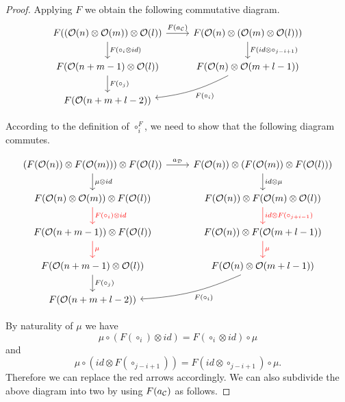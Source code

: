 \documentclass[Thesis.tex]{subfiles}
\begin{document}
\begin{proof}
 Applying $F$ we obtain the following commutative diagram.
  \begin{equation}\label{assaux}
\begin{tikzcd}
F((\OO(n)\otimes \OO(m))\otimes \OO(l)) \arrow[r, "F(a_\CC)"]\arrow[d, "F(\circ_i\otimes id)"] & F(\OO(n)\otimes (\OO(m)\otimes\OO(l)))\arrow[d, "F(id\otimes\circ_{j-i+1})"]\\
F(\OO(n+m-1)\otimes\OO(l))\arrow[d, "F(\circ_j)"] & F(\OO(n)\otimes\OO(m+l-1))\arrow[dl, bend left = 10, "F(\circ_i)"]\\
F(\OO(n+m+l-2)) & 
\end{tikzcd} 
   \end{equation}
   
   According to the definition of $\circ_i^F$, we need to show that the following diagram commutes. 
   
   \[   
\begin{tikzcd}
(F(\OO(n))\otimes F(\OO(m)))\otimes F(\OO(l)) \arrow[r, "a_\DD"] \arrow[d, "\mu\otimes id"] & F(\OO(n))\otimes (F(\OO(m))\otimes F(\OO(l)))\arrow[d, "id\otimes \mu"]\\
F(\OO(n)\otimes \OO(m))\otimes F(\OO(l))\arrow[d, red, "F(\circ_i)\otimes id"] & F(\OO(n))\otimes F(\OO(m)\otimes\OO(l))\arrow[d, red, "id\otimes F(\circ_{j+i-1})"]\\
F(\OO(n+m-1))\otimes F(\OO(l))\arrow[d, red, "\mu"] & F(\OO(n))\otimes F(\OO(m+l-1))\arrow[d, red, "\mu"]\\
F(\OO(n+m-1)\otimes\OO(l))\arrow[d, "F(\circ_j)"] & F(\OO(n)\otimes\OO(m+l-1))\arrow[dl, bend left = 10, "F(\circ_i)"]\\
F(\OO(n+m+l-2)) & 
\end{tikzcd}   
   \]
   
   By naturality of $\mu$ we have 
   \begin{equation}\label{naturality}
   \mu\circ (F(\circ_i)\otimes id)= F( \circ_i \otimes id)\circ \mu 
   \end{equation} and \[\mu\circ (id \otimes F(\circ_{j-i+1}))= F(id\otimes \circ_{j-i+1})\circ \mu.\]
    Therefore we can replace the red arrows accordingly. We can also subdivide the above diagram into two by using $F(a_{\mathcal C})$ as follows.
   

\end{proof}
\end{document}
